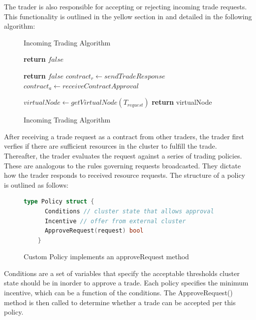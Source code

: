 The trader is also responsible for accepting or rejecting incoming trade
requests. This functionality is outlined in the yellow section in 
and detailed in the following algorithm: 

\begin{figure}[H]
\begin{algorithm}[H]
\caption{Incoming Trading Algorithm}
\begin{algorithmic}
   
    
     
      \State \textbf{return} $false$ 
    \EndIf

      \State \textbf{return} $false$ 
      \EndIf
    \EndFor
    \State $contract_r \gets sendTradeResponse$ 
    \State $contract_a \gets receiveContractApproval$ 

    \State $virtualNode \gets getVirtualNode(T_{request})$     
    \State \textbf{return} virtualNode 
  \EndProcedure
\end{algorithmic}
\end{algorithm}
\caption{Incoming Trading Algorithm}
\end{figure}

After receiving a trade request as a contract from other traders, the trader
first verfies if there are sufficient resources in the cluster to fulfill the
trade. Thereafter, the trader evaluates the request against a series of trading
policies. These are analogous to the rules governing requests broadcasted. They
dictate how the trader responds to received resource requests. The structure of
a policy is outlined as follows:

\begin{figure}[H]
  \begin{lstlisting}[language=go]
    type Policy struct {
      Conditions // cluster state that allows approval
      Incentive // offer from external cluster
      ApproveRequest(request) bool 
    } 
  \end{lstlisting}
  \caption{Custom Policy implements an approveRequest method}
\end{figure}

Conditions are a set of variables that specify the acceptable thresholds
cluster state should be in inorder to approve a trade. Each policy specifies
the minimum incentive, which can be a function of the conditions. The
ApproveRequest() method is then called to determine whether a trade can be
accepted per this policy.

